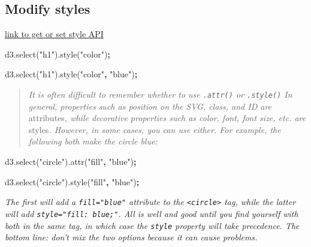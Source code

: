 \documentclass[openany]{book}
\newenvironment{Shaded}{\begin{snugshade}}{\end{snugshade}}
\newcommand{\AttributeTok}[1]{\textcolor[rgb]{0.77,0.63,0.00}{#1}}
\newcommand{\NormalTok}[1]{#1}
\newcommand{\OperatorTok}[1]{\textcolor[rgb]{0.81,0.36,0.00}{\textbf{#1}}}
\newcommand{\StringTok}[1]{\textcolor[rgb]{0.31,0.60,0.02}{#1}}
\newcommand{\VariableTok}[1]{\textcolor[rgb]{0.00,0.00,0.00}{#1}}
\begin{document}
\hypertarget{modify-styles}{%
\subsection{Modify styles}\label{modify-styles}}

\href{https://github.com/d3/d3-selection/blob/v1.4.0/README.md\#selection_style}{link to get or set style API}

\begin{Shaded}
\begin{Highlighting}[]
\VariableTok{d3}\NormalTok{.}\AttributeTok{select}\NormalTok{(}\StringTok{"h1"}\NormalTok{).}\AttributeTok{style}\NormalTok{(}\StringTok{"color"}\NormalTok{)}\OperatorTok{;}

\VariableTok{d3}\NormalTok{.}\AttributeTok{select}\NormalTok{(}\StringTok{"h1"}\NormalTok{).}\AttributeTok{style}\NormalTok{(}\StringTok{"color"}\OperatorTok{,} \StringTok{"blue"}\NormalTok{)}\OperatorTok{;}
\end{Highlighting}
\end{Shaded}

\begin{quote}
 \emph{It is often difficult to remember whether to use \texttt{.attr()} or \texttt{.style()} In general, properties such as position on the SVG, class, and ID are }attributes\emph{, while decorative properties such as color, font, font size, etc. are }styles\emph{. However, in some cases, you can use either. For example, the following both make the circle blue:}
\end{quote}

\begin{Shaded}
\begin{Highlighting}[]
\VariableTok{d3}\NormalTok{.}\AttributeTok{select}\NormalTok{(}\StringTok{"circle"}\NormalTok{).}\AttributeTok{attr}\NormalTok{(}\StringTok{"fill"}\OperatorTok{,} \StringTok{"blue"}\NormalTok{)}\OperatorTok{;}

\VariableTok{d3}\NormalTok{.}\AttributeTok{select}\NormalTok{(}\StringTok{"circle"}\NormalTok{).}\AttributeTok{style}\NormalTok{(}\StringTok{"fill"}\OperatorTok{,} \StringTok{"blue"}\NormalTok{)}\OperatorTok{;}
\end{Highlighting}
\end{Shaded}

\emph{The first will add a \texttt{fill="blue"} attribute to the \texttt{\textless{}circle\textgreater{}} tag, while the latter will add \texttt{style="fill:\ blue;"}. All is well and good until you find yourself with both in the same tag, in which case the \texttt{style} property will take precedence. The bottom line: don't mix the two options because it can cause problems.}
\end{document}
